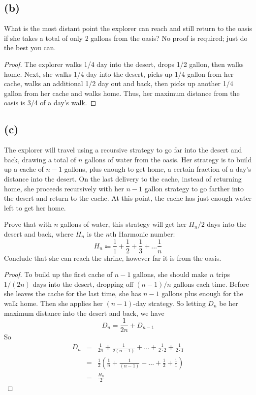 \documentclass[14pt]{extarticle}
\newcommand{\dps}{\displaystyle}
\begin{document}
\subsection{(b)}
What is the most distant point the explorer can reach and still return to the oasis if she takes a total of only 2 gallons from the oasis? No proof is required; just do the best you can.
\begin{proof}
The explorer walks 1/4 day into the desert, drops 1/2 gallon, then walks home. Next, she walks 1/4 day into the desert, picks up 1/4 gallon from her cache, walks an additional 1/2 day out and back, then picks up another 1/4 gallon from her cache and walks home. Thus, her maximum distance from the oasis is 3/4 of a day’s walk.
\end{proof}

\subsection{(c)}
The explorer will travel using a recursive strategy to go far into the desert and back, drawing a total of $n$ gallons of water from the oasis. Her strategy is to build up a cache of $n - 1$ gallons, plus enough to get home, a certain fraction of a day’s distance into the desert. On the last delivery to the cache, instead of returning home, she proceeds recursively with her $n - 1$ gallon strategy to go farther into the desert and return to the cache. At this point, the cache has just enough water left to get her home.

Prove that with $n$ gallons of water, this strategy will get her $H_n /2$ days into the desert and back, where $H_n$ is the $n$th Harmonic number:
$$
H_n \Coloneqq \frac{1}{1} + \frac{1}{2} + \frac{1}{3} +  \ldots \frac{1}{n} 
$$
Conclude that she can reach the shrine, however far it is from the oasis.
\begin{proof}
To build up the first cache of $n - 1$ gallons, she should make $n$ trips $1/(2n)$ days into the desert, dropping off $(n - 1)/n$ gallons each time. Before she leaves the cache for the last time, she has $n - 1$ gallons plus enough for the walk home. Then she applies her $(n - 1)$-day strategy. So letting $D_n$ be her maximum distance into the desert and back, we have
$$
D_n = \frac{1}{2n} + D_{n-1}
$$
So
$$
\begin{array}{rcl}
D_n&=&\dps \frac{1}{2n} + \frac{1}{2(n-1)} + \ldots + \frac{1}{2 \cdot 2} + \frac{1}{2 \cdot 1}\\
&=&\dps\frac{1}{2}\left(\frac{1}{n} + \frac{1}{(n-1)} + \ldots + \frac{1}{2} + \frac{1}{1}\right)\\
&=&\dps\frac{H_n}{2}
\end{array}
$$
\end{proof}
\end{document}
